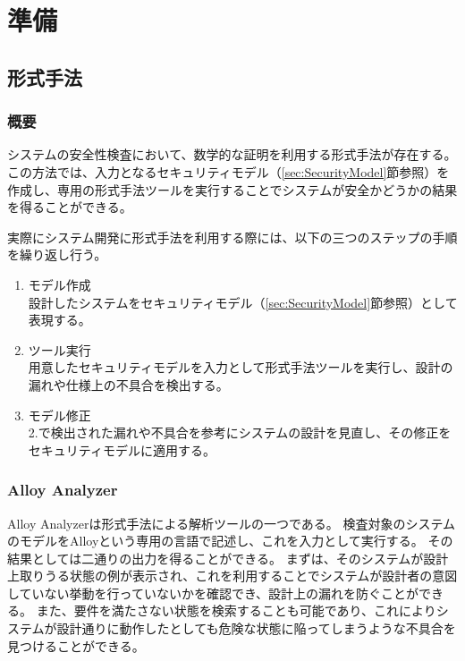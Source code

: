 \documentclass[12pt,a4paper]{jbook}
\begin{document}
\newpage

\chapter{準備}
\section{形式手法}
\subsection{概要}
%
システムの安全性検査において、数学的な証明を利用する形式手法が存在する。
この方法では、入力となるセキュリティモデル（\ref{sec:SecurityModel}節参照）を作成し、専用の形式手法ツールを実行することでシステムが安全かどうかの結果を得ることができる。

実際にシステム開発に形式手法を利用する際には、以下の三つのステップの手順を繰り返し行う。
\begin{enumerate}
\item モデル作成\\
設計したシステムをセキュリティモデル（\ref{sec:SecurityModel}節参照）として表現する。
\item ツール実行\\
用意したセキュリティモデルを入力として形式手法ツールを実行し、設計の漏れや仕様上の不具合を検出する。
\item モデル修正\\
2.で検出された漏れや不具合を参考にシステムの設計を見直し、その修正をセキュリティモデルに適用する。
\end{enumerate}

\subsection{Alloy Analyzer}
Alloy Analyzerは形式手法による解析ツールの一つである。
検査対象のシステムのモデルをAlloyという専用の言語で記述し、これを入力として実行する。
その結果としては二通りの出力を得ることができる。
まずは、そのシステムが設計上取りうる状態の例が表示され、これを利用することでシステムが設計者の意図していない挙動を行っていないかを確認でき、設計上の漏れを防ぐことができる。
また、要件を満たさない状態を検索することも可能であり、これによりシステムが設計通りに動作したとしても危険な状態に陥ってしまうような不具合を見つけることができる。
\end{document}

